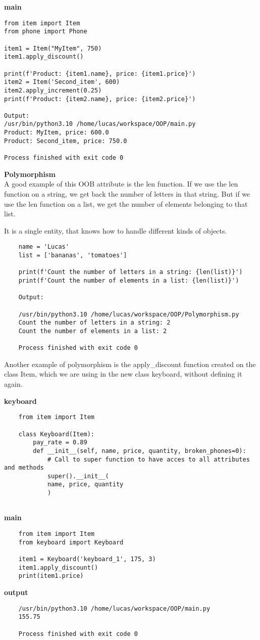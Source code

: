 \documentclass{article}
\begin{document}
\textbf{main}

\begin{lstlisting}
from item import Item
from phone import Phone

item1 = Item("MyItem", 750)
item1.apply_discount()

print(f'Product: {item1.name}, price: {item1.price}')
item2 = Item('Second_item', 600)
item2.apply_increment(0.25)
print(f'Product: {item2.name}, price: {item2.price}')

Output:
/usr/bin/python3.10 /home/lucas/workspace/OOP/main.py 
Product: MyItem, price: 600.0
Product: Second_item, price: 750.0

Process finished with exit code 0	
\end{lstlisting}

\textbf{Polymorphism}\\
A good example of this OOB attribute is the len function. 
If we use the len function on a string, we get back the number of letters in that string.
But if we use the len function on a list, we get the number of elements belonging to that list.

It is a single entity, that knows how to handle different kinds of objects.

\begin{lstlisting}
	name = 'Lucas'
	list = ['bananas', 'tomatoes']
	
	print(f'Count the number of letters in a string: {len(list)}')
	print(f'Count the number of elements in a list: {len(list)}')
	
	Output:
	
	/usr/bin/python3.10 /home/lucas/workspace/OOP/Polymorphism.py 
	Count the number of letters in a string: 2
	Count the number of elements in a list: 2
	
	Process finished with exit code 0
\end{lstlisting}
Another example of polymorphism is the apply\_discount function created on the class Item, which we are using in the new class keyboard, without defining it again. 

\textbf{keyboard}
\begin{lstlisting}
	from item import Item
	
	class Keyboard(Item):
		pay_rate = 0.89
		def __init__(self, name, price, quantity, broken_phones=0):
			# Call to super function to have acces to all attributes and methods
			super().__init__(
			name, price, quantity
			)
	
\end{lstlisting}

\textbf{main}
\begin{lstlisting}
	from item import Item
	from keyboard import Keyboard
	
	item1 = Keyboard('keyboard_1', 175, 3)
	item1.apply_discount()
	print(item1.price)
\end{lstlisting}


\textbf{output}
\begin{lstlisting}
	/usr/bin/python3.10 /home/lucas/workspace/OOP/main.py 
	155.75
	
	Process finished with exit code 0
	
\end{lstlisting}
\end{document}
